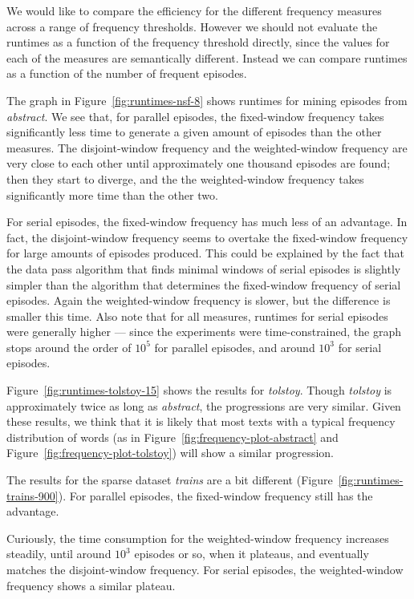 We would like to compare the efficiency for the different frequency measures across a range of frequency thresholds. However we should not evaluate the runtimes as a function of the frequency threshold directly, since the values for each of the measures are semantically different. Instead we can compare runtimes as a function of the number of frequent episodes.

The graph in Figure~\ref{fig:runtimes-nsf-8} shows runtimes for mining episodes from \emph{abstract}. We see that, for parallel episodes, the fixed-window frequency takes significantly less time to generate a given amount of episodes than the other measures. The disjoint-window frequency and the weighted-window frequency are very close to each other until approximately one thousand episodes are found; then they start to diverge, and the the weighted-window frequency takes significantly more time than the other two.

For serial episodes, the fixed-window frequency has much less of an advantage. In fact, the disjoint-window frequency seems to overtake the fixed-window frequency for large amounts of episodes produced. This could be explained by the fact that the data pass algorithm that finds minimal windows of serial episodes is slightly simpler than the algorithm that determines the fixed-window frequency of serial episodes. Again the weighted-window frequency is slower, but the difference is smaller this time. Also note that for all measures, runtimes for serial episodes were generally higher --- since the experiments were time-constrained, the graph stops around the order of $ 10^5 $ for parallel episodes, and around $ 10^3 $ for serial episodes.

Figure~\ref{fig:runtimes-tolstoy-15} shows the results for \emph{tolstoy}. Though \emph{tolstoy} is approximately twice as long as \emph{abstract}, the progressions are very similar. Given these results, we think that it is likely that most texts with a typical frequency distribution of words (as in Figure~\ref{fig:frequency-plot-abstract} and Figure~\ref{fig:frequency-plot-tolstoy}) will show a similar progression.

The results for the sparse dataset \emph{trains} are a bit different (Figure~\ref{fig:runtimes-trains-900}). For parallel episodes, the fixed-window frequency still has the advantage.

Curiously, the time consumption for the weighted-window frequency increases steadily, until around $ 10^3 $ episodes or so, when it plateaus, and eventually matches the disjoint-window frequency. For serial episodes, the weighted-window frequency shows a similar plateau.

